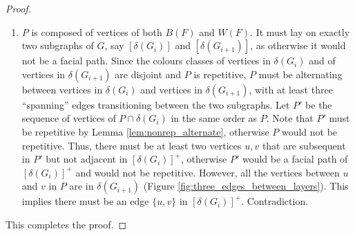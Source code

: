 \documentclass{patmorin}
\begin{document}
\begin{proof}
\begin{enumerate}
  \item $P$ is composed of vertices of both $B(F)$ and $W(F)$. It must lay on exactly two subgraphs of $G$, say $[\delta(G_i)]$ and $[\delta(G_{i+1})]$, as otherwise it would not be a facial path. Since the colours classes of vertices in $\delta(G_i)$ and of vertices in $\delta(G_{i+1})$ are disjoint and $P$ is repetitive, $P$ must be alternating between vertices in $\delta(G_i)$ and vertices in $\delta(G_{i+1})$, with at least three ``spanning'' edges transitioning between the two subgraphs. Let $P'$ be the sequence of vertices of $P \cap \delta(G_i)$ in the same order as $P$. Note that $P'$ must be repetitive by Lemma \ref{lem:nonrep_alternate}, otherwise $P$ would not be repetitive. Thus, there must be at least two vertices $u,v$ that are subsequent in $P'$ but not adjacent in $[\delta(G_i)]^+$, otherwise $P'$ would be a facial path of $[\delta(G_i)]^+$ and would not be repetitive.  
  However, all the vertices between $u$ and $v$ in $P$ are in $\delta(G_{i+1})$ (Figure \ref{fig:three_edges_between_layers}). This implies there must be an edge $\{u,v\}$ in $[\delta(G_i)]^+$. Contradiction.
%   
%   
%   
%   
 \end{enumerate}
 This completes the proof. 
\end{proof}
\end{document}
